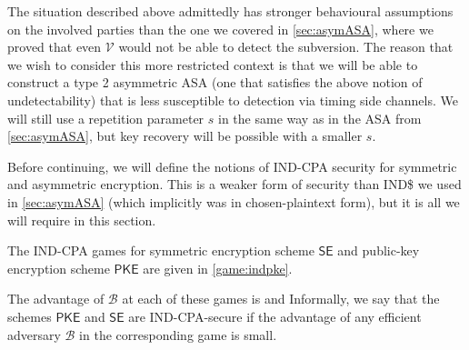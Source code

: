 The situation described above admittedly has stronger behavioural assumptions on the involved parties than the one we covered in \autoref{sec:asymASA}, where we proved that even $\mathcal{V}$ would not be able to detect the subversion. The reason that we wish to consider this more restricted context is that we will be able to construct a type 2 asymmetric ASA (one that satisfies the above notion of undetectability) that is less susceptible to detection via timing side channels. We will still use a repetition parameter $s$ in the same way as in the ASA from \autoref{sec:asymASA}, but key recovery will be possible with a smaller $s$.

Before continuing, we will define the notions of IND-CPA security for symmetric and asymmetric encryption. This is a weaker form of security than IND\$ we used in \autoref{sec:asymASA} (which implicitly was in chosen-plaintext form), but it is all we will require in this section.

The IND-CPA games for symmetric encryption scheme $\mathsf{SE}$ and public-key encryption scheme $\mathsf{PKE}$ are given in \autoref{game:indpke}.

The advantage of $\mathcal{B}$ at each of these games is
and
Informally, we say that the schemes $\mathsf{PKE}$ and $\mathsf{SE}$ are IND-CPA-secure if the advantage of any efficient adversary $\mathcal{B}$ in the corresponding game is small.

